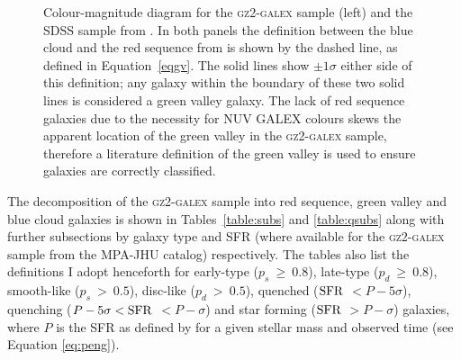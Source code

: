 \begin{figure}
\caption[Colour-magnitude diagram showing the location of the Baldry et al. (2004) green valley definition]{Colour-magnitude diagram for the \textsc{gz2-galex} sample (left) and the SDSS sample from \citet[][right]{Baldry04}. In both panels the definition between the blue cloud and the red sequence from \citet{Baldry04} is shown by the dashed line, as defined in Equation~\ref{eqgv}. The solid lines show $\pm 1\sigma$ either side of this definition; any galaxy within the boundary of these two solid lines is considered a green valley galaxy. The lack of red sequence galaxies due to the necessity for NUV GALEX colours skews the apparent location of the green valley in the \textsc{gz2-galex} sample, therefore a literature definition of the green valley is used to ensure galaxies are correctly classified.}
\label{fig:CMGV}
\end{figure}

The decomposition of the \textsc{gz2-galex} sample into red sequence, green valley and blue cloud galaxies is shown in Tables~\ref{table:subs} and \ref{table:qsubs} along with further subsections by galaxy type and SFR (where available for the \textsc{gz2-galex} sample from the MPA-JHU catalog) respectively. The tables also list the definitions I adopt henceforth for early-type ($p_s~ \geq~0.8$), late-type ($p_d~ \geq~0.8$), smooth-like ($p_s~ >~0.5$), disc-like ($p_d~ >~0.5$), quenched ($\rm{SFR}$ $ < P - 5\sigma$), quenching ($P - 5\sigma < \rm{SFR}$ $< P - \sigma$) and star forming  ($\rm{SFR}$ $> P -\sigma$) galaxies, where $P$ is the SFR as defined by \citet{peng10} for a given stellar mass and observed time (see Equation \ref{eq:peng}). 

